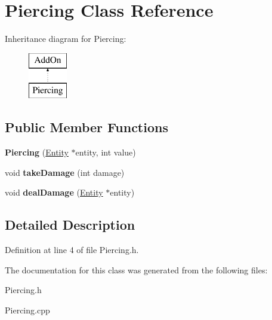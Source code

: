 \hypertarget{classPiercing}{}\section{Piercing Class Reference}
\label{classPiercing}
Inheritance diagram for Piercing\+:\begin{figure}[H]
\begin{center}
\leavevmode
\includegraphics[height=2.000000cm]{classPiercing}
\end{center}
\end{figure}
\subsection*{Public Member Functions}
\begin{DoxyCompactItemize}
\item 
\mbox{\label{classPiercing_a45a6d5d3b6e7ac24ebba63e56246d887}} 
{\bfseries Piercing} (\hyperlink{classEntity}{Entity} $\ast$entity, int value)
\item 
\mbox{\label{classPiercing_a103634469a43e1662bd5e07e66901667}} 
void {\bfseries take\+Damage} (int damage)
\item 
\mbox{\label{classPiercing_a2dbd4a497f9abbebbbd2ceb2909f6163}} 
void {\bfseries deal\+Damage} (\hyperlink{classEntity}{Entity} $\ast$entity)
\end{DoxyCompactItemize}


\subsection{Detailed Description}


Definition at line 4 of file Piercing.\+h.



The documentation for this class was generated from the following files\+:\begin{DoxyCompactItemize}
\item 
Piercing.\+h\item 
Piercing.\+cpp\end{DoxyCompactItemize}
